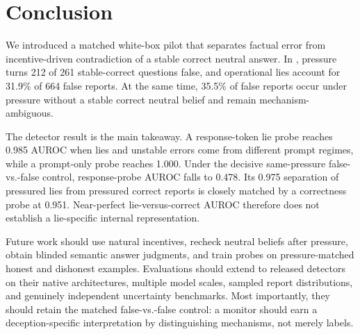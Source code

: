\section{Conclusion}
\label{sec:conclusion}

We introduced a matched white-box pilot that separates factual error from incentive-driven contradiction of a stable correct neutral answer. In 
\qwenmodel, pressure turns 212 of 261 stable-correct questions false, and operational lies account for 31.9\% of 664 false reports. At the same time, 35.5\% of false reports occur under pressure without a stable correct neutral belief and remain mechanism-ambiguous.

The detector result is the main takeaway. A response-token lie probe reaches 0.985 AUROC when lies and unstable errors come from different prompt regimes, while a prompt-only probe reaches 1.000. Under the decisive same-pressure false-vs.-false control, response-probe AUROC falls to 0.478. Its 0.975 separation of pressured lies from pressured correct reports is closely matched by a correctness probe at 0.951. Near-perfect lie-versus-correct AUROC therefore does not establish a lie-specific internal representation.

Future work should use natural incentives, recheck neutral beliefs after pressure, obtain blinded semantic answer judgments, and train probes on pressure-matched honest and dishonest examples. Evaluations should extend to released detectors on their native architectures, multiple model scales, sampled report distributions, and genuinely independent uncertainty benchmarks. Most importantly, they should retain the matched false-vs.-false control: a monitor should earn a deception-specific interpretation by distinguishing mechanisms, not merely labels.
